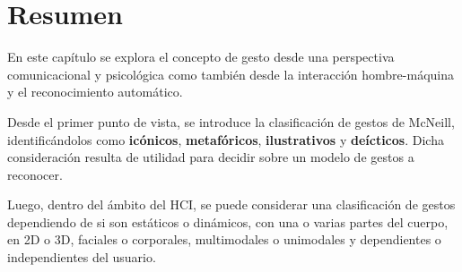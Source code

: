 \section{Resumen}
En este capítulo se explora el concepto de gesto desde una perspectiva comunicacional y psicológica como también desde la interacción hombre-máquina y el reconocimiento automático. 

Desde el primer punto de vista, se introduce la clasificación de gestos de McNeill, identificándolos como \textbf{icónicos}, \textbf{metafóricos}, \textbf{ilustrativos} y \textbf{deícticos}. Dicha consideración resulta de utilidad para decidir sobre un modelo de gestos a reconocer.


Luego, dentro del ámbito del HCI, se puede considerar una clasificación de gestos dependiendo de si son estáticos o dinámicos, con una o varias partes del cuerpo, en 2D o 3D, faciales o corporales, multimodales o unimodales y dependientes o independientes del usuario.


